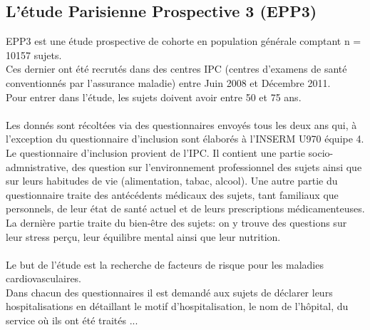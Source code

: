 \documentclass{book}
\begin{document}

\subsection{L'étude Parisienne Prospective 3 (EPP3)}
\noindent
EPP3 est une étude prospective de cohorte en population générale comptant n = 10157 sujets.\\
Ces dernier ont été recrutés dans des centres IPC (centres d'examens de santé conventionnés par l'assurance maladie) entre Juin 2008 et Décembre 2011.\\
Pour entrer dans l'étude, les sujets doivent avoir entre 50 et 75 ans.\\
\\
Les donnés sont récoltées via des questionnaires envoyés tous les deux ans qui, à l'exception du questionnaire d'inclusion sont élaborés à l'INSERM U970 équipe 4. \\
Le questionnaire d'inclusion provient de l'IPC. Il contient une partie socio-admnistrative, des question sur l'environnement professionnel des sujets ainsi que sur leurs habitudes de vie (alimentation, tabac, alcool). 
Une autre partie du questionnaire traite des antécédents médicaux des sujets, tant familiaux que personnels, de leur état de santé actuel et de leurs prescriptions médicamenteuses.
La dernière partie traite du bien-être des sujets: on y trouve des questions sur leur stress perçu, leur équilibre mental ainsi que leur nutrition.\\
\\
Le but de l'étude est la recherche de facteurs de risque pour les maladies cardiovasculaires.\\ 
Dans chacun des questionnaires il est demandé aux sujets de déclarer leurs hospitalisations en détaillant le motif d'hospitalisation, le nom de l'hôpital, du service où ils ont été traités ...
\end{document}
